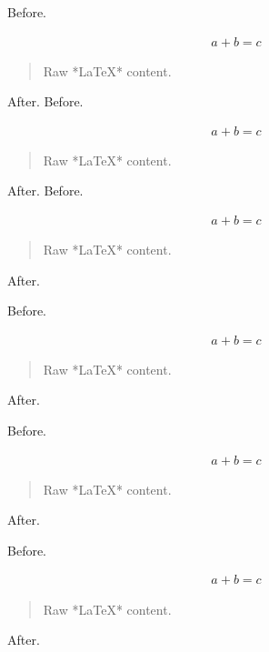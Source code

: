 Before.

\begin{align*}
a + b = c
\end{align*}


\begin{quote}
Raw *LaTeX* content.
\end{quote}

After.
Before.

\begin{align*}
a + b = c
\end{align*}


\begin{quote}
Raw *LaTeX* content.
\end{quote}

After.
Before.

\begin{align*}
a + b = c
\end{align*}


\begin{quote}
Raw *LaTeX* content.
\end{quote}

After.
\begin{frame}[t]
Before.

\begin{align*}
a + b = c
\end{align*}


\begin{quote}
Raw *LaTeX* content.
\end{quote}

After.
\end{frame}

\begin{frame}[t]
Before.

\begin{align*}
a + b = c
\end{align*}


\begin{quote}
Raw *LaTeX* content.
\end{quote}

After.
\end{frame}

\begin{frame}[t]
Before.

\begin{align*}
a + b = c
\end{align*}


\begin{quote}
Raw *LaTeX* content.
\end{quote}

After.
\end{frame}


